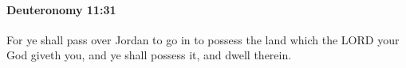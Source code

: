 
		\paragraph{Deuteronomy 11:31} %
			\label{DEUTERONOMY-11-31}

			For ye shall pass over Jordan to go in to possess the land which the LORD your God giveth you, and ye shall possess it, and dwell therein.


